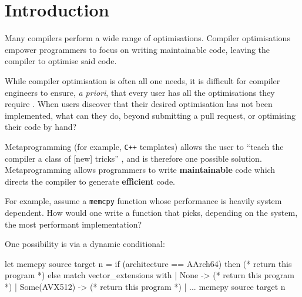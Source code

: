 \chapter{Introduction}

Many compilers perform a wide range of optimisations. Compiler optimisations empower programmers to focus on writing maintainable code, leaving the compiler to optimise said code. 

While compiler optimisation is often all one needs, it is difficult for compiler engineers to ensure, \textit{a priori}, that every user has all the optimisations they require \citep{rice-53, robinson-01}. When users discover that their desired optimisation has not been implemented, what can they do, beyond submitting a pull request, or optimising their code by hand?

Metaprogramming (for example, \texttt{C++} templates) \citep{abrahams-04} allows the user to ``teach the compiler a class of [new] tricks'' \citep{sheard-02}, and is therefore one possible solution. Metaprogramming allows programmers to write \textbf{maintainable} code which directs the compiler to generate \textbf{efficient} code. 

For example, assume a \texttt{memcpy} function whose performance is heavily system dependent. How would one write a function that picks, depending on the system, the most performant implementation?

One possibility is via a dynamic conditional:
\begin{ocaml}
let memcpy source target n = if (architecture == AArch64) then 
                               (* return this program *)
                             else 
                                match vector_extensions with
                                | None -> (* return this program *)
                                | Some(AVX512) -> (* return this program *)
                                | ...
memcpy source target n
\end{ocaml}

